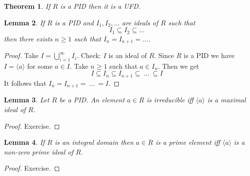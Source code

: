\documentclass[12pt, letterpaper, oneside]{article}
\theoremstyle{plain}
\newtheorem{theorem}{Theorem}[section]
\newtheorem{lemma}[theorem]{Lemma}
\theoremstyle{definition}
\newcommand{\subgp}[1]{\langle#1\rangle}
\newcommand{\vs}{\vskip 5mm}
\begin{document}
\begin{theorem}
\label{THM_PIDISUFD}
If $R$ is a PID then it is a UFD.  
\end{theorem}


\vs\vs

\begin{lemma}
\label{LEMMA_PIDISNOETH}
If $R$ is a PID and $I_{1}, I_{2}, \dots$ are ideals of $R$ such that 
$$I_{1}\subseteq I_{2} \subseteq \dots$$
then there exists $n\geq 1$ such that $I_{n}=I_{n+1}= \dots $.
\end{lemma}

\vs\vs

\begin{proof}
Take $I = \bigcup_{i=1}^{\infty} I_{i}$. Check: $I$ is an ideal of $R$. Since $R$ is a PID we have 
$I = \subgp{a}$ for some $a\in I$. Take $n\geq 1$ such that $a\in I_{n}$. Then we get 
$$I  \subseteq I_{n}\subseteq I_{n+1}\subseteq \ {\dots}\  \subseteq I$$  
It follows that $I_{n} = I_{n+1} = \ {\dots}\  =  I$.
\end{proof}

\vs\vs

\begin{lemma}
\label{LEMMA_IRREDMAXID}
Let $R$ be a PID. An element $a\in R$ is irreducible iff $\subgp{a}$ is a maximal 
ideal of $R$.
\end{lemma}


\begin{proof}
Exercise.
\end{proof}

\vs\vs

\begin{lemma}
\label{LEMMA_PRIMEELTIDEAL}
If $R$ is an integral domain then  $a\in R$ is a prime element iff $\subgp{a}$
is a non-zero prime ideal of $R$.
\end{lemma}

\begin{proof}
Exercise.
\end{proof}


\vs\vs
\end{document}

